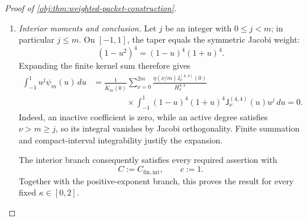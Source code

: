 \documentclass[11pt]{article}
\begin{document}
\begin{proof}[Proof of \cref{obj:thm:weighted-packet-construction}]
\begin{enumerate}
\item \emph{Interior moments and conclusion.}
Let \(j\) be an integer with \(0\le j<m\); in particular \(j\le m\). On \([-1,1]\), the taper equals the symmetric Jacobi weight:
\[
(1-u^2)^4=(1-u)^4(1+u)^4.
\]
Expanding the finite kernel sum therefore gives
\[
\begin{split}
\int_{-1}^1u^j\psi_m(u)\,du
&=
\frac1{\widetilde K_m(0)}
\sum_{\nu=0}^{2m}
\frac{\eta(\nu/m)\mathsf J_\nu^{(4,4)}(0)}
     {H_\nu^{4,4}}\\
&\qquad\qquad{}\times
\int_{-1}^1
(1-u)^4(1+u)^4
\mathsf J_\nu^{(4,4)}(u)u^j\,du
=0.
\end{split}
\]
Indeed, an inactive coefficient is zero, while an active degree satisfies
\(\nu>m\ge j\), so its integral vanishes by Jacobi orthogonality. Finite summation and compact-interval integrability justify the expansion.

The interior branch consequently satisfies every required assertion with
\[
C:=C_{\mathrm{fin,int}},
\qquad c:=1.
\]
Together with the positive-exponent branch, this proves the result for every fixed \(\kappa\in[0,2]\).
\end{enumerate}
\end{proof}
\end{document}
